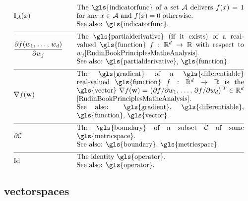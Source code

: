 \begin{align}
	&\indicatorfunc{\mathcal{A}}(x) & \quad & \parbox{.70\textwidth}{The \gls{indicatorfunc} of a set $\mathcal{A}$ 
		delivers $f(x)=1$ for any $x \in \mathcal{A}$ and $f(x)=0$ otherwise.
		\\ See also: \gls{indicatorfunc}. }  \nonumber \\[2mm]  \hline \nonumber\\[-5mm]
	&\frac{\partial f(\weight_{1}, \,\ldots, \,\weight_{\nrfeatures})}{\partial \weight_{\featureidx}} & \quad & \parbox{.70\textwidth}{The \gls{partialderivative} 
		(if it exists) of a real-valued \gls{function} $f: \mathbb{R}^{\featuredim}\rightarrow \mathbb{R}$ with respect 
		to\ $\weight_{\featureidx}$\cite[Ch. 9]{RudinBookPrinciplesMatheAnalysis}.
		\\ See also: \gls{partialderivative}, \gls{function}. } \nonumber \\[2mm]  \hline \nonumber\\[-5mm]
	 &\nabla f(\weights) & \quad & \parbox{.70\textwidth}{The \gls{gradient} of a \gls{differentiable} real-valued \gls{function} 
	 	$f: \mathbb{R}^{\featuredim}\rightarrow \mathbb{R}$ is the \gls{vector} 
	 	$\nabla f(\weights) = \big( {\partial f}/{\partial \weight_{1}}, \,\ldots, \,{\partial f}/{\partial \weight_{\featuredim}}  \big)\,^{T} \in \mathbb{R}^{\featuredim}$ 
		\cite[Ch. 9]{RudinBookPrinciplesMatheAnalysis}.
		\\ See also: \gls{gradient}, \gls{differentiable}, \gls{function}, \gls{vector}.}   \nonumber \\[2mm]  \hline \nonumber\\[-5mm]
	&\bd{\cluster} & \quad & \parbox{.70\textwidth}{The \gls{boundary} of a subset $\cluster$ of some \gls{metricspace}.
		\\ See also: \gls{boundary}, \gls{metricspace}. }   \nonumber \\[2mm]  \hline \nonumber\\[-5mm]
	&\identityop & \quad & \parbox{.70\textwidth}{The identity \gls{operator}.
		\\ See also: \gls{operator}.}   \nonumber
\end{align} 



\subsection*{\Glspl{vectorspace}} 


